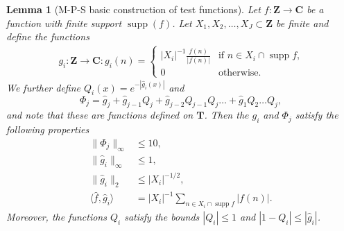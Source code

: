 \documentclass[11pt, reqno]{amsart}
\newtheorem{lemma}[theorem]{Lemma}
\DeclareMathOperator\supp{supp}
\begin{document}
\begin{lemma}[M-P-S basic construction of test functions]\label{lem:basicMPS}
    Let $f:\mathbf{Z}\to\mathbf{C}$ be a function with  finite support $\supp(f)$. Let $X_1,X_2,\dots,X_J\subset\mathbf{Z}$ be finite and define the functions
    \begin{align*}
        g_i:\mathbf{Z}\to\mathbf{C}:g_i(n)=\begin{cases}
            |X_i|^{-1}\frac{f(n)}{|f(n)|} & \text{if $n\in X_i\cap \supp f$,}\\
            0 & \text{otherwise}.
        \end{cases}
    \end{align*}
We further define $Q_i(x)=e^{-|\hat{g}_i(x)|}$ and
\begin{equation*}
    \Phi_j=\hat{g}_j+\hat{g}_{j-1}Q_j+\hat{g}_{j-2}Q_{j-1}Q_{j}\dots+\hat{g}_1Q_2\dots Q_j,
\end{equation*}
and note that these are functions defined on $\mathbf{T}$.
Then the $g_i$ and $\Phi_j$ satisfy the following properties
\begin{align}
\lVert\Phi_j\rVert_\infty&\leqslant 10,\label{basicMPS}\\
    \lVert \hat{g}_i\rVert_\infty&\leqslant 1,\nonumber\\
    \lVert \hat{g}_i\rVert_2&\leqslant |X_i|^{-1/2},\nonumber\\
    \langle \hat{f},\hat{g}_i\rangle &=|X_i|^{-1}\sum_{n\in X_i\cap\supp f}|f(n)|\nonumber.
\end{align}
Moreover, the functions $Q_i$ satisfy the bounds $|Q_i|\leqslant 1$ and $|1-Q_i|\leqslant |\hat{g}_i|$.

\end{lemma}
\end{document}
